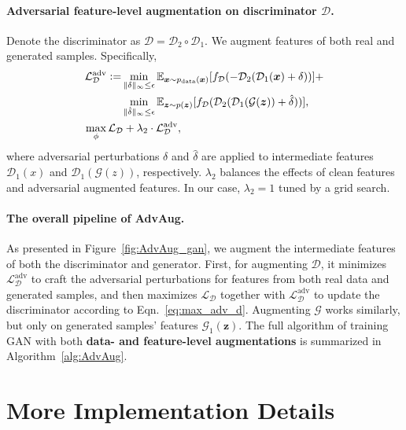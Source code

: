 \documentclass{article}
\newcommand{\Def}[0]{\mathrel{\mathop:}=}
\begin{document}
\vspace{-2mm}
\paragraph{Adversarial feature-level augmentation on discriminator $\mathcal{D}$.} Denote the discriminator as $\mathcal{D}=\mathcal{D}_2\circ\mathcal{D}_1$. We augment  features of both real and generated samples. Specifically,
\begin{align}
\mathcal{L}^{\mathrm{adv}}_{\mathcal{D}}\Def & \min_{\|\delta\|_{\infty}\le\epsilon}\mathbb{E}_{\boldsymbol{x}\sim p_{\mathrm{data}}(\boldsymbol{x})}[f_{\mathcal{D}}(-\mathcal{D}_2(\mathcal{D}_1(\boldsymbol{x})+\delta))] + \nonumber \\
& \min_{\|\hat\delta\|_{\infty}\le\epsilon}\mathbb{E}_{\boldsymbol{z}\sim p(\boldsymbol{z})}[f_{\mathcal{D}}(\mathcal{D}_2(\mathcal{D}_1(\mathcal{G}(\boldsymbol{z}))+\hat\delta))], \label{eq:adv_d} \\
& \hspace{-12mm} \max_{\phi}\mathcal{L}_\mathcal{D}+\lambda_2\cdot\mathcal{L}^{\mathrm{adv}}_{\mathcal{D}}, \label{eq:max_adv_d}
\end{align}
where adversarial perturbations $\delta$ and $\hat\delta$ are applied to intermediate features $\mathcal{D}_1(x)$ and $\mathcal{D}_1(\mathcal{G}(z))$, respectively. $\lambda_2$ balances the effects of clean features and adversarial augmented features. In our case, $\lambda_2=1$ tuned by a grid search.

\paragraph{The overall pipeline of AdvAug.} As presented in Figure~\ref{fig:AdvAug_gan}, we augment the intermediate features of both the discriminator and generator. First, for augmenting $\mathcal{D}$, it minimizes $\mathcal{L}_{\mathcal{D}}^{\mathrm{adv}}$ to craft the adversarial perturbations for features from both real data and generated samples, and then maximizes $\mathcal{L}_{\mathcal{D}}$ together with $\mathcal{L}_{\mathcal{D}}^{\mathrm{adv}}$ to update the discriminator according to Eqn.~\ref{eq:max_adv_d}. Augmenting $\mathcal{G}$ works similarly, but only on generated samples' features $\mathcal{G}_1(\boldsymbol{z})$. The full algorithm of training GAN with both \textbf{data- and feature-level augmentations} is summarized in Algorithm~\ref{alg:AdvAug}.

\section{More Implementation Details} \label{sec:more_implement_details}
\end{document}
